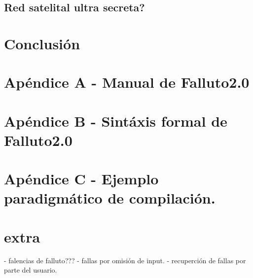 \documentclass[titlepage, 12pt]{book}
\begin{document}
			\section{Red satelital ultra secreta?}


\chapter{Conclusi\'on}

\chapter{Ap\'endice A - Manual de Falluto2.0}

\chapter{Ap\'endice B - Sint\'axis formal de Falluto2.0}

\chapter{Ap\'endice C - Ejemplo paradigm\'atico de compilaci\'on.}




\chapter{extra}
	- falencias de falluto??? 
	- fallas por omisi\'on de input.
	- recuperci\'on de fallas por parte del usuario.
\end{document}

